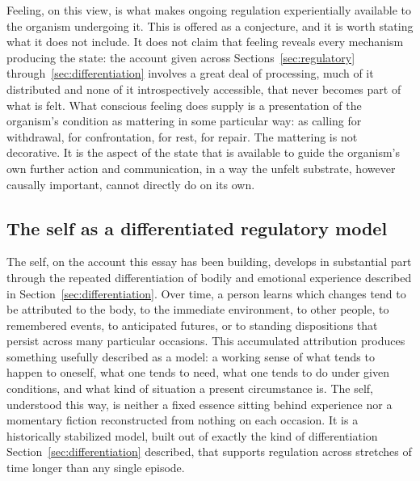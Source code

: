 \documentclass[11pt]{article}
\begin{document}
Feeling, on this view, is what makes ongoing regulation experientially available to the organism undergoing it. This is offered as a conjecture, and it is worth stating what it does not include. It does not claim that feeling reveals every mechanism producing the state: the account given across Sections~\ref{sec:regulatory} through~\ref{sec:differentiation} involves a great deal of processing, much of it distributed and none of it introspectively accessible, that never becomes part of what is felt. What conscious feeling does supply is a presentation of the organism's condition as mattering in some particular way: as calling for withdrawal, for confrontation, for rest, for repair. The mattering is not decorative. It is the aspect of the state that is available to guide the organism's own further action and communication, in a way the unfelt substrate, however causally important, cannot directly do on its own.

\subsection{The self as a differentiated regulatory model}

The self, on the account this essay has been building, develops in substantial part through the repeated differentiation of bodily and emotional experience described in Section~\ref{sec:differentiation}. Over time, a person learns which changes tend to be attributed to the body, to the immediate environment, to other people, to remembered events, to anticipated futures, or to standing dispositions that persist across many particular occasions. This accumulated attribution produces something usefully described as a model: a working sense of what tends to happen to oneself, what one tends to need, what one tends to do under given conditions, and what kind of situation a present circumstance is. The self, understood this way, is neither a fixed essence sitting behind experience nor a momentary fiction reconstructed from nothing on each occasion. It is a historically stabilized model, built out of exactly the kind of differentiation Section~\ref{sec:differentiation} described, that supports regulation across stretches of time longer than any single episode.
\end{document}
